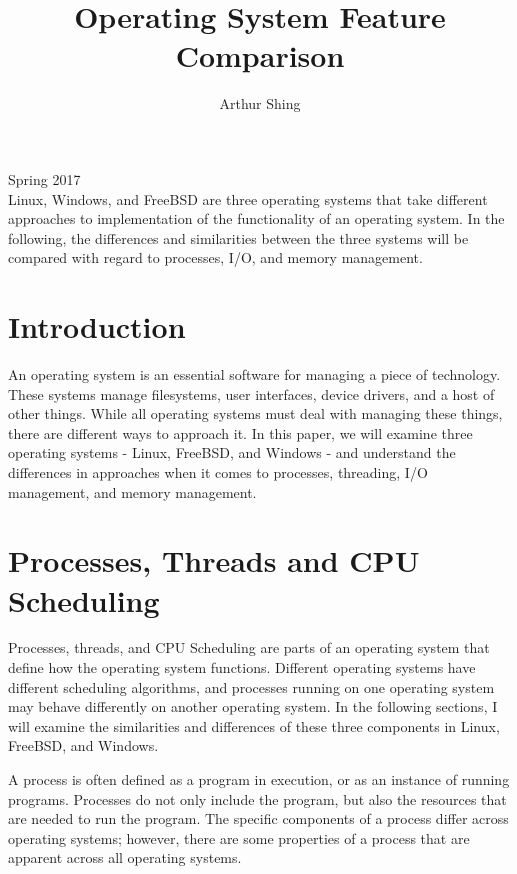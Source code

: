 \documentclass[journal, letterpaper, draftclsnofoot, onecolumn, 10pt]{IEEEtran}
\begin{document}
\title{Operating System Feature Comparison}
\author{Arthur Shing}


\begin{titlepage}
    \centering
    \maketitle
    Spring 2017\\
    \vspace{2cm}
    Linux, Windows, and FreeBSD are three operating systems that take different approaches to implementation of the functionality of an operating system. In the following, the differences and similarities between the three systems will be compared with regard to processes, I/O, and memory management.



\end{titlepage}
\tableofcontents
\clearpage


\section{Introduction}

An operating system is an essential software for managing a piece of technology. These systems manage filesystems, user interfaces, device drivers, and a host of other things. While all operating systems must deal with managing these things, there are different ways to approach it. In this paper, we will examine three operating systems - Linux, FreeBSD, and Windows - and understand the differences in approaches when it comes to processes, threading, I/O management, and memory management.
\section{Processes, Threads and CPU Scheduling}

Processes, threads, and CPU Scheduling are parts of an operating system that define how the operating system functions. Different operating systems have different scheduling algorithms, and processes running on one operating system may behave differently on another operating system. In the following sections, I will examine the similarities and differences of these three components in Linux, FreeBSD, and Windows.


A process is often defined as a program in execution, or as an instance of running programs. Processes do not only include the program, but also the resources that are needed to run the program. The specific components of a process differ across operating systems; however, there are some properties of a process that are apparent across all operating systems.
\end{document}
